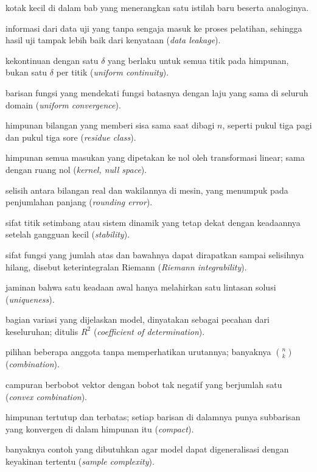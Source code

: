 \documentclass[11pt,a4paper,oneside]{book}
\theoremstyle{definition}
\theoremstyle{plain}
\theoremstyle{remark}
\begin{document}
\begin{description}[style=nextline,itemsep=0.35em]
  \item[Kamus] kotak kecil di dalam bab yang menerangkan satu istilah baru beserta analoginya.
  \item[Kebocoran data] informasi dari data uji yang tanpa sengaja masuk ke proses pelatihan, sehingga hasil uji tampak lebih baik dari kenyataan (\emph{data leakage}).
  \item[Kekontinuan seragam] kekontinuan dengan satu $\delta$ yang berlaku untuk semua titik pada himpunan, bukan satu $\delta$ per titik (\emph{uniform continuity}).
  \item[Kekonvergenan seragam] barisan fungsi yang mendekati fungsi batasnya dengan laju yang sama di seluruh domain (\emph{uniform convergence}).
  \item[Kelas sisa] himpunan bilangan yang memberi sisa sama saat dibagi $n$, seperti pukul tiga pagi dan pukul tiga sore (\emph{residue class}).
  \item[Kernel] himpunan semua masukan yang dipetakan ke nol oleh transformasi linear; sama dengan ruang nol (\emph{kernel, null space}).
  \item[Kesalahan pembulatan] selisih antara bilangan real dan wakilannya di mesin, yang menumpuk pada penjumlahan panjang (\emph{rounding error}).
  \item[Kestabilan] sifat titik setimbang atau sistem dinamik yang tetap dekat dengan keadaannya setelah gangguan kecil (\emph{stability}).
  \item[Keterintegralan] sifat fungsi yang jumlah atas dan bawahnya dapat dirapatkan sampai selisihnya hilang, disebut keterintegralan Riemann (\emph{Riemann integrability}).
  \item[Ketunggalan] jaminan bahwa satu keadaan awal hanya melahirkan satu lintasan solusi (\emph{uniqueness}).
  \item[Koefisien determinasi] bagian variasi yang dijelaskan model, dinyatakan sebagai pecahan dari keseluruhan; ditulis $R^2$ (\emph{coefficient of determination}).
  \item[Kombinasi] pilihan beberapa anggota tanpa memperhatikan urutannya; banyaknya $\binom{n}{k}$ (\emph{combination}).
  \item[Kombinasi konveks] campuran berbobot vektor dengan bobot tak negatif yang berjumlah satu (\emph{convex combination}).
  \item[Kompak] himpunan tertutup dan terbatas; setiap barisan di dalamnya punya subbarisan yang konvergen di dalam himpunan itu (\emph{compact}).
  \item[Kompleksitas sampel] banyaknya contoh yang dibutuhkan agar model dapat digeneralisasi dengan keyakinan tertentu (\emph{sample complexity}).

\end{description}
\end{document}
